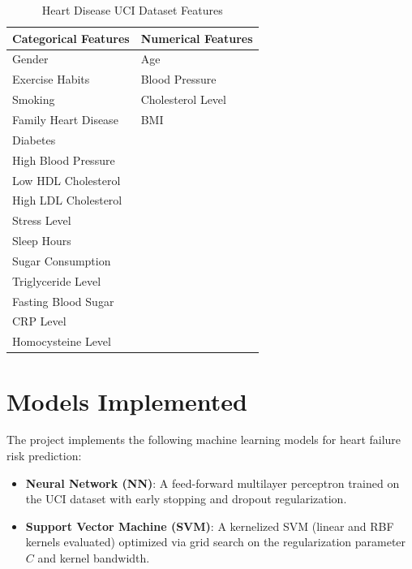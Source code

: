 \documentclass[11pt,a4paper]{article}
\begin{document}
\begin{table}[H]
    \centering
    \caption{Heart Disease UCI Dataset Features}
    \begin{tabular}{|p{}|p{}|}
        \hline
        \textbf{Categorical Features} & \textbf{Numerical Features} \\
        \hline
        Gender                        & Age                         \\
        Exercise Habits               & Blood Pressure              \\
        Smoking                       & Cholesterol Level           \\
        Family Heart Disease          & BMI                         \\
        Diabetes                      &                             \\
        High Blood Pressure           &                             \\
        Low HDL Cholesterol           &                             \\
        High LDL Cholesterol          &                             \\
        Stress Level                  &                             \\
        Sleep Hours                   &                             \\
        Sugar Consumption             &                             \\
        Triglyceride Level            &                             \\
        Fasting Blood Sugar           &                             \\
        CRP Level                     &                             \\
        Homocysteine Level            &                             \\
        \hline
    \end{tabular}
\end{table}

\section{Models Implemented}
The project implements the following machine learning models for heart
failure risk prediction:
\begin{itemize}
    \vspace{-0.25cm}
    \item \textbf{Neural Network (NN)}: A feed-forward multilayer perceptron trained on the UCI dataset with early stopping and dropout regularization.
    \item \textbf{Support Vector Machine (SVM)}: A kernelized SVM (linear and RBF kernels evaluated) optimized via grid search on the regularization parameter $C$ and kernel bandwidth.
\end{itemize}
\end{document}
